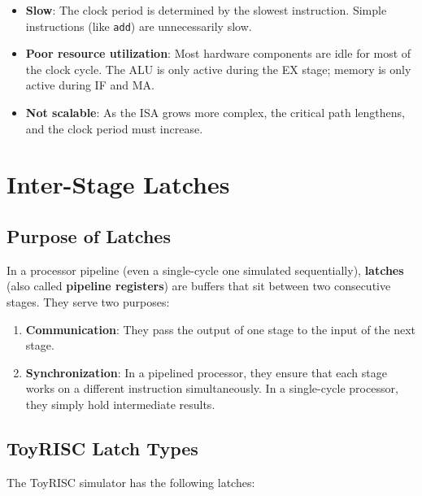 \documentclass[12pt,a4paper]{article}
\begin{document}
\begin{tcolorbox}[colback=red!5, colframe=red!50!black, title=Disadvantages of Single-Cycle Design]
\begin{itemize}
    \item \textbf{Slow}: The clock period is determined by the slowest instruction. Simple instructions (like \texttt{add}) are unnecessarily slow.
    \item \textbf{Poor resource utilization}: Most hardware components are idle for most of the clock cycle. The ALU is only active during the EX stage; memory is only active during IF and MA.
    \item \textbf{Not scalable}: As the ISA grows more complex, the critical path lengthens, and the clock period must increase.
\end{itemize}
\end{tcolorbox}

\section{Inter-Stage Latches}

\subsection{Purpose of Latches}

In a processor pipeline (even a single-cycle one simulated sequentially), \textbf{latches} (also called \textbf{pipeline registers}) are buffers that sit between two consecutive stages. They serve two purposes:

\begin{enumerate}
    \item \textbf{Communication}: They pass the output of one stage to the input of the next stage.
    \item \textbf{Synchronization}: In a pipelined processor, they ensure that each stage works on a different instruction simultaneously. In a single-cycle processor, they simply hold intermediate results.
\end{enumerate}

\subsection{ToyRISC Latch Types}

The ToyRISC simulator has the following latches:
\end{document}
